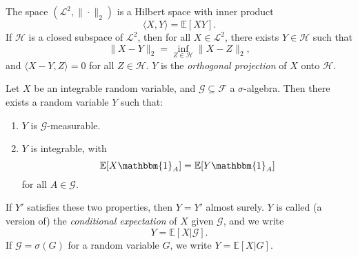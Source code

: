 \documentclass[12pt]{article}
\begin{document}
\begin{theorem}
	The space $(\mathcal{L}^2, \|\cdot\|_2)$ is a Hilbert space with inner product
	\[
	\langle X, Y \rangle = \mathbb{E}[XY].
	\]
	If $\mathcal{H}$ is a closed subspace of $\mathcal{L}^2$, then for all $X \in \mathcal{L}^2$, there exists $Y \in \mathcal{H}$ such that
	\[
	\|X - Y\|_2 = \inf_{Z \in \mathcal{H}}\|X - Z\|_2,
	\]
	and  $\langle X - Y, Z \rangle = 0$ for all $Z \in \mathcal{H}$. $Y$ is the \emph{orthogonal projection} of $X$ onto $\mathcal{H}$.
\end{theorem}

\begin{theorem}
	Let $X$ be an integrable random variable, and $\mathcal{G} \subseteq \mathcal{F}$ a $\sigma$-algebra. Then there exists a random variable $Y$ such that:
	\begin{enumerate}[\normalfont(i)]
		\item $Y$ is $\mathcal{G}$-measurable.
		\item $Y$ is integrable, with
			\[
			\mathbb{E}[X \mathbbm{1}_{A}] = \mathbb{E}[Y \mathbbm{1}_{A}]
			\]
			for all $A \in \mathcal{G}$.
	\end{enumerate}
	If $Y'$ satisfies these two properties, then $Y = Y'$ almost surely. $Y$ is called (a version of) the \emph{conditional expectation} of $X$ given $\mathcal{G}$, and we write
	\[
	Y = \mathbb{E}[X | \mathcal{G}].
	\]
	If $\mathcal{G} = \sigma(G)$ for a random variable $G$, we write $Y = \mathbb{E}[X | G]$.
\end{theorem}
\end{document}
